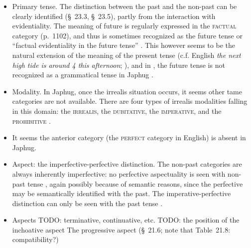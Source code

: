 \documentclass[a4paper, oneside, 12pt]{report}
\newcommand*{\citesec}[1]{\S~{#1}}
\newcommand*{\citetable}[1]{Table~{#1}}
\newcommand*{\citepage}[1]{p.~{#1}}
\newcommand*{\citepages}[1]{pp.~{#1}}
\newcommand{\form}[1]{\emph{#1}}
\newcommand{\category}[1]{\textsc{#1}}
\begin{document}
\begin{itemize}
    \item Primary tense. 
    The distinction between the past and the non-past
    can be clearly identified (\citesec{23.3}, \citesec{23.5}),
    partly from the interaction with evidentiality.
    The meaning of future
    is regularly expressed in the \category{factual} category (\citepage{1102}),
    and thus is sometimes recognized as the future tense 
    or ``factual evidentiality in the future tense'' 
    \citep[\citepage{518}]{jacques2019egophoric}.
    This however seems to be the natural extension of the meaning 
    of the present tense 
    (c.f. English \form{the next high tide is around 4 this afternoon}; 
    \citealt[\citepage{131}, {[20]}]{cgel}),
    and in \citet{jacques2021grammar}, 
    the future tense is not recognized as a grammatical tense in Japhug
    \citep[\citepage{1102}, (46)]{jacques2021grammar}.

    \item Modality. 
        In Japhug, once the irrealis situation occurs, 
        it seems other \acs{tame} categories are not available. 
        There are four types of irrealis modalities falling in this domain:
        the \category{irrealis}, the \category{dubitative}, 
        the \category{imperative}, and the \category{prohibitive}
        \citep[\citesec{21.4}]{jacques2021grammar}.

    \item It seems the anterior category
        (the \category{perfect} category in English)
        is absent in Japhug.

    \item Aspect: the imperfective-perfective distinction.
        The non-past categories are always inherently imperfective:
        no perfective aspectuality is seen with non-past tense 
        \citep[\citepage{517}]{jacques2019egophoric},
        again possibly because of semantic reasons,
        since the perfective may be semantically identified with the past.
        The imperative-perfective distinction can only be seen 
        with the past tense \citep[\citetable{21.1}, note that the \category{aorist} is also known as 
        the \category{past perfective}; \citepages{1135, 1143}]{jacques2021grammar}.
    \item Aspects TODO: terminative, continuative, etc. TODO: the position of the inchoative aspect 
        The progressive aspect (\citesec{21.6}; note that \citetable{21.8}: compatibility?) 
\end{itemize}
\end{document}
